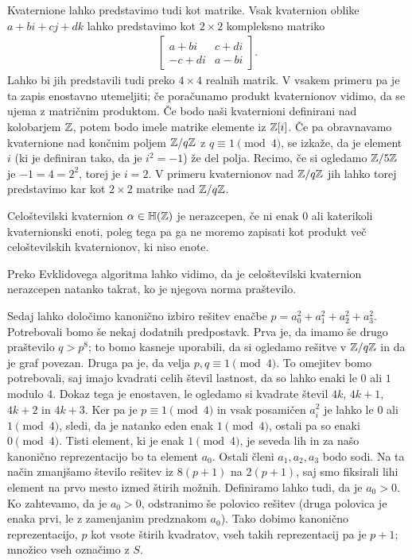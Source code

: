Kvaternione lahko predstavimo tudi kot matrike. Vsak kvaternion oblike \(a + bi + cj + dk\) lahko predstavimo kot \(2\times 2\) kompleksno matriko
\begin{align*}
    \begin{bmatrix}
        a+bi  & c+di \\
        -c+di & a-bi
    \end{bmatrix}.
\end{align*}
Lahko bi jih predstavili tudi preko \(4\times 4\) realnih matrik. V vsakem primeru pa je ta zapis enostavno utemeljiti; če poračunamo produkt kvaternionov vidimo, da se ujema z matričnim produktom. Če bodo naši kvaternioni definirani nad kolobarjem \(\mathbb Z\), potem bodo imele matrike elemente iz \(\mathbb Z[i]\). Če pa obravnavamo kvaternione nad končnim poljem \(\mathbb Z/q\mathbb Z\) z \(q \equiv 1 \pmod 4\), se izkaže, da je element \(i\) (ki je definiran tako, da je \(i^2 = -1\)) že del polja. Recimo, če si ogledamo \(\mathbb Z/5\mathbb Z\) je \(-1 = 4 = 2^2\), torej je \(i=2\). V primeru kvaternionov nad \(\mathbb Z/q\mathbb Z\) jih lahko torej predstavimo kar kot \(2\times 2\) matrike nad \(\mathbb Z/q\mathbb Z\).

\begin{definicija}
    Celoštevilski kvaternion \(\alpha\in \mathbb H(\mathbb Z)\) je nerazcepen, če ni enak \(0\) ali katerikoli kvaternionski enoti, poleg tega pa ga ne moremo zapisati kot produkt več celoštevilskih kvaternionov, ki niso enote.
\end{definicija}
Preko Evklidovega algoritma lahko vidimo, da je celoštevilski kvaternion nerazcepen natanko takrat, ko je njegova norma praštevilo. 

Sedaj lahko določimo kanonično izbiro rešitev enačbe \(p=a_0^2 + a_1^2 + a_2^2 + a_3^2\). Potrebovali bomo še nekaj dodatnih predpostavk. Prva je, da imamo še drugo praštevilo \(q>p^8\); to bomo kasneje uporabili, da si ogledamo rešitve v \(\mathbb Z/q\mathbb Z\) in da je graf povezan. Druga pa je, da velja \(p,q \equiv 1 \pmod 4\). To omejitev bomo potrebovali, saj imajo kvadrati celih števil lastnost, da so lahko enaki le \(0\) ali \(1\) modulo 4. Dokaz tega je enostaven, le ogledamo si kvadrate števil \(4k\), \(4k+1\), \(4k+2\) in \(4k+3\). Ker pa je \(p\equiv 1 \pmod 4\) in vsak posamičen \(a_i^2\) je lahko le \(0\) ali \(1\pmod 4\), sledi, da je natanko eden enak \(1\pmod4\), ostali pa so enaki \(0\pmod 4\). Tisti element, ki je enak \(1\pmod4\), je seveda lih in za našo kanonično reprezentacijo bo ta element \(a_0\). Ostali členi \(a_1, a_2, a_3\) bodo sodi. Na ta način zmanjšamo število rešitev iz \(8(p+1)\) na \(2(p+1)\), saj smo fiksirali lihi element na prvo mesto izmed štirih možnih. Definiramo lahko tudi, da je \(a_0>0\). Ko zahtevamo, da je \(a_0>0\), odstranimo še polovico rešitev (druga polovica je enaka prvi, le z zamenjanim predznakom \(a_0\)). Tako dobimo kanonično reprezentacijo, \(p\) kot vsote štirih kvadratov, vseh takih reprezentacij pa je \(p+1\); množico vseh označimo z \(S\).

